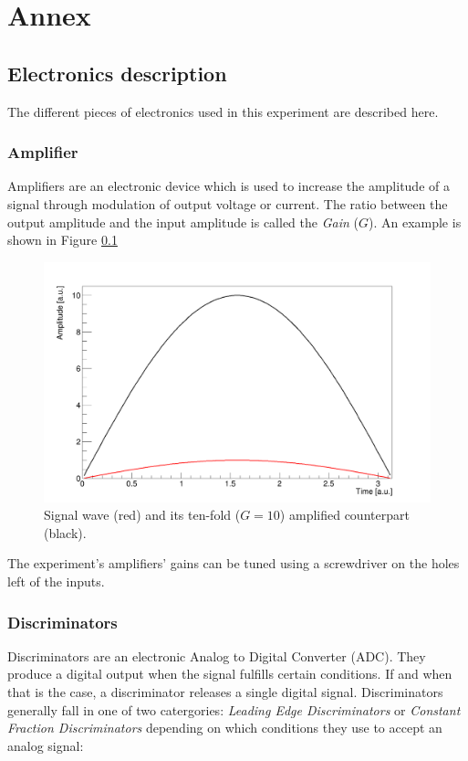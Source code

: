 \chapter*{Annex}

\section{Electronics description}


The different pieces of electronics used in this experiment are described here.

\subsection{Amplifier}

Amplifiers are an electronic device which is used to increase the amplitude of a signal through modulation of output voltage or current. The ratio between the output amplitude and the input amplitude is called the \textit{Gain} ($G$). An example is shown in Figure \ref{fig:amplisin}

\begin{figure}[htbp]
\centering
\includegraphics[width=0.7\linewidth]{./fig/amplisin.png}
\caption{Signal wave (red) and its ten-fold ($G=10$) amplified counterpart (black).}
\label{fig:amplisin}
\end{figure}

The experiment's amplifiers' gains can be tuned using a screwdriver on the holes left of the inputs.


\subsection{Discriminators}


Discriminators are an electronic Analog to Digital Converter (ADC). They produce a digital output when the signal fulfills certain conditions. If and when that is the case, a discriminator releases a single digital signal. Discriminators generally fall in one of two catergories: \textit{Leading Edge Discriminators} or \textit{Constant Fraction Discriminators} depending on which conditions they use to accept an analog signal:

